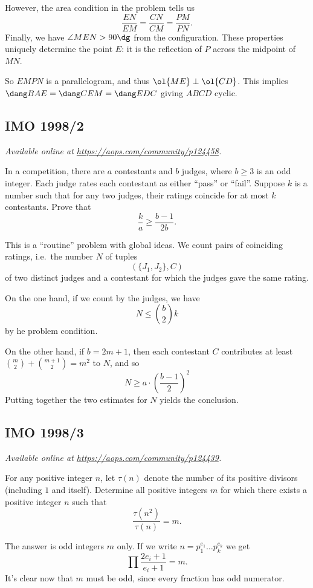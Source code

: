 \documentclass[11pt]{scrartcl}
\begin{document}
However, the area condition in the problem tells us
\[ \frac{EN}{EM} = \frac{CN}{CM} = \frac{PM}{PN}. \]
Finally, we have $\angle MEN > 90\dg$ from the configuration.
These properties uniquely determine the point $E$:
it is the reflection of $P$ across the midpoint of $MN$.

So $EMPN$ is a parallelogram, and thus $\ol{ME} \perp \ol{CD}$.
This implies $\dang BAE = \dang CEM = \dang EDC$ giving $ABCD$ cyclic.
\pagebreak

\subsection{IMO 1998/2}
\textsl{Available online at \url{https://aops.com/community/p124458}.}
\begin{mdframed}[style=mdpurplebox,frametitle={Problem statement}]
In a competition, there are $a$ contestants
and $b$ judges, where $b \ge 3$ is an odd integer.
Each judge rates each contestant as either ``pass'' or ``fail''.
Suppose $k$ is a number such that for any two judges,
their ratings coincide for at most $k$ contestants.
Prove that
\[ \frac ka \ge \frac{b-1}{2b}. \]
\end{mdframed}
This is a ``routine'' problem with global ideas.
We count pairs of coinciding ratings,
i.e.\ the number $N$ of tuples
\[(\{J_1, J_2\}, C) \]
of two distinct judges and a contestant
for which the judges gave the same rating.

On the one hand, if we count by the judges,
we have \[ N \le \binom b2 k \]
by he problem condition.

On the other hand, if $b=2m+1$, then
each contestant $C$
contributes at least $\binom{m}{2} + \binom{m+1}{2} = m^2$ to $N$,
and so
\[ N \ge a \cdot \left( \frac{b-1}{2} \right)^2 \]
Putting together the two estimates for $N$ yields the conclusion.
\pagebreak

\subsection{IMO 1998/3}
\textsl{Available online at \url{https://aops.com/community/p124439}.}
\begin{mdframed}[style=mdpurplebox,frametitle={Problem statement}]
For any positive integer $n$,
let $\tau(n)$ denote the number of its positive divisors (including $1$ and itself).
Determine all positive integers $m$ for which
there exists a positive integer $n$ such that
\[ \frac{\tau(n^{2})}{\tau(n)}=m. \]
\end{mdframed}
The answer is odd integers $m$ only.
If we write $n = p_1^{e_1} \dots p_k^{e_k}$ we get
\[ \prod \frac{2e_i+1}{e_i+1} = m. \]
It's clear now that $m$ must be odd,
since every fraction has odd numerator.
\end{document}
